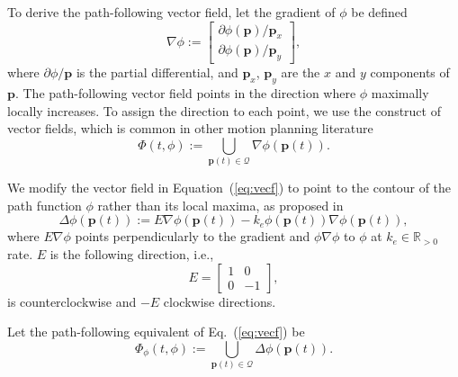 \documentclass[letterpaper,10pt,conference,twoside]{IEEEtran}
\theoremstyle{definition}
\begin{document}
To derive the path-following vector field, let the gradient of $\phi$ be defined
\begin{equation}
  \nabla\phi:=\begin{bmatrix}
    \partial\phi(\mathbf{p})/\mathbf{p}_x\\
    \partial\phi(\mathbf{p})/\mathbf{p}_y
  \end{bmatrix},
\end{equation}
where $\partial\phi/\mathbf{p}$ is the partial differential, and $\mathbf{p}_x$, $\mathbf{p}_y$ are the $x$ and $y$ components of $\mathbf{p}$.
The path-following vector field points in the direction where $\phi$ maximally locally increases. To assign the direction to each point, we use the construct of vector fields, which is common in other motion planning literature~\cite{%
garcia2017guidance,goncalves2010vector}
\begin{equation}\label{eq:vecf}
  \Phi(t,\phi):={\textstyle \bigcup\limits_{\mathbf{p}(t)\in\mathcal{Q}}}\nabla\phi(\mathbf{p}(t)).
\end{equation}

We modify the vector field in Equation~(\ref{eq:vecf}) to point to the contour of the path function $\phi$ rather than its local maxima, as proposed in~\cite{garcia2017guidance}
\begin{equation}\label{eq:pfvf}
  \Delta\phi(\mathbf{p}(t)):=E\nabla\phi(\mathbf{p}(t))-k_e\phi(\mathbf{p}(t))\nabla\phi(\mathbf{p}(t)),
\end{equation}
where $E\nabla\phi$ points perpendicularly to the gradient and $\phi\nabla\phi$ to $\phi$ at $k_e\in\mathbb{R}_{>0}$ rate. $E$ is the following direction, i.e.,
\begin{equation}
  E=\begin{bmatrix}
    1 & 0\\ 0 & -1
  \end{bmatrix},
\end{equation}
is counterclockwise and $-E$ clockwise directions.%

Let the path-following equivalent of Eq.~(\ref{eq:vecf}) be 
\begin{equation}
  \Phi_\phi(t,\phi):={\textstyle \bigcup\limits_{\mathbf{p}(t)\in\mathcal{Q}}}\Delta\phi(\mathbf{p}(t)).
\end{equation}
\end{document}
